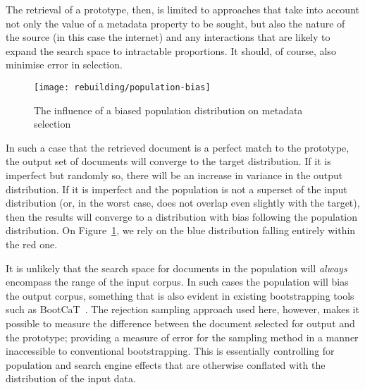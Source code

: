 The retrieval of a prototype, then, is limited to approaches that take into account not only the value of a metadata property to be sought, but also the nature of the source (in this case the internet) and any interactions that are likely to expand the search space to intractable proportions.  It should, of course, also minimise error in selection.


\begin{figure}[h]
    \centering
    \texttt{[image: rebuilding/population-bias]}
    \caption{The influence of a biased population distribution on metadata selection}
    \label{fig:rebuilding:population-bias}
\end{figure}


In such a case that the retrieved document is a perfect match to the prototype, the output set of documents will converge to the target distribution.  If it is imperfect but randomly so, there will be an increase in variance in the output distribution.  If it is imperfect and the population is not a superset of the input distribution (or, in the worst case, does not overlap even slightly with the target), then the results will converge to a distribution with bias following the population distribution.  On Figure~\ref{fig:rebuilding:population-bias}, we rely on the blue distribution falling entirely within the red one.


It is unlikely that the search space for documents in the population will \textsl{always} encompass the range of the input corpus.  In such cases the population will bias the output corpus, something that is also evident in existing bootstrapping tools such as BootCaT~\cite{baroni2004bootcat}.  The rejection sampling approach used here, however, makes it possible to measure the difference between the document selected for output and the prototype; providing a measure of error for the sampling method in a manner inaccessible to conventional bootstrapping.  This is essentially controlling for population and search engine effects that are otherwise conflated with the distribution of the input data.



